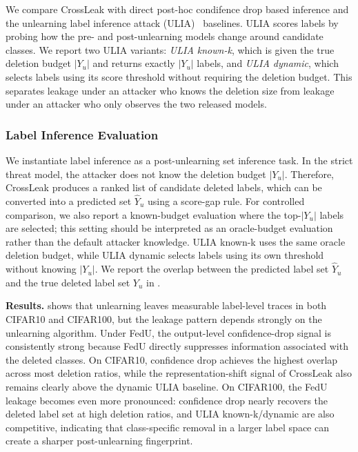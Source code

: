 We compare CrossLeak with direct post-hoc condifence drop based inference \citep{hu2024learn} and the unlearning label inference attack (ULIA)~\citep{wang2025label} baselines. ULIA scores labels by probing how the pre- and post-unlearning models change around candidate classes. We report two ULIA variants: \textit{ULIA known-k}, which is given the true deletion budget $|Y_u|$ and returns exactly $|Y_u|$ labels, and \textit{ULIA dynamic}, which selects labels using its score threshold without requiring the deletion budget. This separates leakage under an attacker who knows the deletion size from leakage under an attacker who only observes the two released models.



\subsubsection{Label Inference Evaluation}


We instantiate label inference as a post-unlearning set inference task. In the strict threat model, the attacker does not know the deletion budget $|Y_u|$. Therefore, CrossLeak produces a ranked list of candidate deleted labels, which can be converted into a predicted set $\hat{Y}_u$ using a score-gap rule. For controlled comparison, we also report a known-budget evaluation where the top-$|Y_u|$ labels are selected; this setting should be interpreted as an oracle-budget evaluation rather than the default attacker knowledge. ULIA known-k uses the same oracle deletion budget, while ULIA dynamic selects labels using its own threshold without knowing $|Y_u|$. We report the overlap between the predicted label set $\hat{Y}_u$ and the true deleted label set $Y_u$ in .

\noindent
\textbf{Results.}  shows that unlearning leaves measurable label-level traces in both CIFAR10 and CIFAR100, but the leakage pattern depends strongly on the unlearning algorithm. Under FedU, the output-level confidence-drop signal is consistently strong because FedU directly suppresses information associated with the deleted classes. On CIFAR10, confidence drop achieves the highest overlap across most deletion ratios, while the representation-shift signal of CrossLeak also remains clearly above the dynamic ULIA baseline. On CIFAR100, the FedU leakage becomes even more pronounced: confidence drop nearly recovers the deleted label set at high deletion ratios, and ULIA known-k/dynamic are also competitive, indicating that class-specific removal in a larger label space can create a sharper post-unlearning fingerprint.

